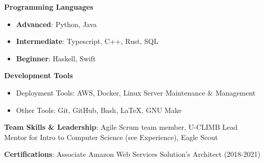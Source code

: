 \vspace{-2.0mm}


\begin{cventries}
\vspace{-5mm}
  \cventry
    {}
    {}
    {}
    {}
    {
      \begin{cvitems}
        \item {\textbf{Programming Languages}}
        \begin{itemize}
        \item \textbf{Advanced}: Python, Java
        \item \textbf{Intermediate}: Typescript, C++, Rust, SQL
        \item \textbf{Beginner}: Haskell, Swift
        \end{itemize}
        \item {\textbf{Development Tools}}
        \begin{itemize}
        \item {Deployment Tools: AWS, Docker, Linux Server Maintenance \& Management}
        \item {Other Tools: Git, GitHub, Bash, \LaTeX, GNU Make}
        \end {itemize}
        \item {\textbf{Team Skills \& Leadership}: Agile Scrum team
            member, U-CLIMB Lead Mentor for Intro to Computer Science (see Experience),
    Eagle Scout}
          \item {\textbf{Certifications}: Associate Amazon Web Services Solution's Architect (2018-2021)}
      \end{cvitems}
    }
    {}
\end{cventries}
